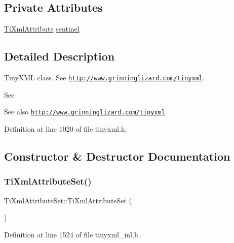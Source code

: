 \subsection*{Private Attributes}
\begin{DoxyCompactItemize}
\item 
\hyperlink{class_ti_xml_attribute}{Ti\+Xml\+Attribute} \hyperlink{class_ti_xml_attribute_set_a1fda20434a148e7d09dd3ecc8e85db9c}{sentinel}
\end{DoxyCompactItemize}


\subsection{Detailed Description}
Tiny\+X\+ML class. See \href{http://www.grinninglizard.com/tinyxml}{\tt http\+://www.\+grinninglizard.\+com/tinyxml}. 

See \begin{DoxySeeAlso}{See also}
\href{http://www.grinninglizard.com/tinyxml}{\tt http\+://www.\+grinninglizard.\+com/tinyxml} 
\end{DoxySeeAlso}


Definition at line 1020 of file tinyxml.\+h.



\subsection{Constructor \& Destructor Documentation}
\hypertarget{class_ti_xml_attribute_set_a253c33b657cc85a07f7f060b02146c35}{}\label{class_ti_xml_attribute_set_a253c33b657cc85a07f7f060b02146c35} 
\subsubsection{\texorpdfstring{Ti\+Xml\+Attribute\+Set()}{TiXmlAttributeSet()}\hspace{0.1cm}{\footnotesize\ttfamily [1/2]}}
{\footnotesize\ttfamily Ti\+Xml\+Attribute\+Set\+::\+Ti\+Xml\+Attribute\+Set (\begin{DoxyParamCaption}{ }\end{DoxyParamCaption})}



Definition at line 1524 of file tinyxml\+\_\+inl.\+h.

\hypertarget{class_ti_xml_attribute_set_add463905dff96142a29fe16a01ecf28f}{}\label{class_ti_xml_attribute_set_add463905dff96142a29fe16a01ecf28f} 
